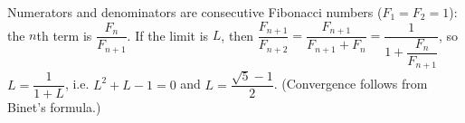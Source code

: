 Numerators and denominators are consecutive Fibonacci numbers ($F_1=F_2=1$): the $n$th term is $\dfrac{F_n}{F_{n+1}}$. If the limit is $L$, then $\dfrac{F_{n+1}}{F_{n+2}}=\dfrac{F_{n+1}}{F_{n+1}+F_n}=\dfrac1{1+\dfrac{F_n}{F_{n+1}}}$, so $L=\dfrac1{1+L}$, i.e. $L^2+L-1=0$ and $L=\boxed{\dfrac{\sqrt5-1}2}$. (Convergence follows from Binet's formula.)
